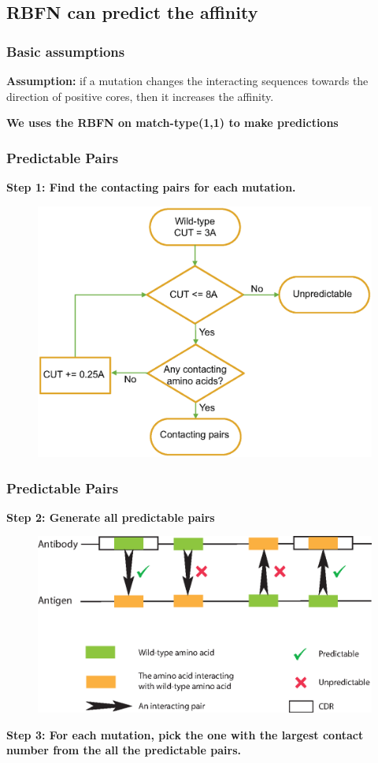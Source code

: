 \documentclass[hyperref={pdfpagelabels=false}]{beamer}
\begin{document}
\subsection{RBFN can predict the affinity}
\begin{frame}
\frametitle{Basic assumptions}
\textbf{Assumption:} if a mutation changes the interacting sequences towards the direction of positive cores, then it increases the affinity.
\vspace{1cm}

\textbf{We uses the RBFN on match-type(1,1) to make predictions}
\end{frame}

\begin{frame}
\frametitle{Predictable Pairs}
\textbf{Step 1: Find the contacting pairs for each mutation.}
\begin{figure}
	\centering
	\includegraphics[scale=0.3]{ContactingPairs.eps}
\end{figure}
\end{frame}

\begin{frame}
\frametitle{Predictable Pairs}
\textbf{Step 2: Generate all predictable pairs}
\begin{figure}
	\centering
	\includegraphics[scale=0.3]{Predictable.eps}
\end{figure}
\textbf{Step 3: For each mutation, pick the one with the largest contact number from the all the predictable pairs.}
\end{frame}
\end{document}
